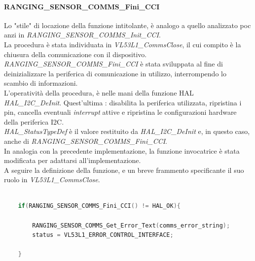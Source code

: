 \documentclass[11pt]{report}
\begin{document}
\paragraph{RANGING\_SENSOR\_COMMS\_Fini\_CCI}
Lo "stile" di locazione della funzione intitolante, è analogo a quello analizzato poc anzi in \textit{RANGING\_SENSOR\_COMMS\_Init\_CCI}.\\
La procedura è stata individuata in \textit{VL53L1\_CommsClose}, il cui compito è la chiusura della comunicazione con il dispositivo.\\
\textit{RANGING\_SENSOR\_COMMS\_Fini\_CCI} è stata sviluppata al fine di deinizializzare la periferica di comunicazione in utilizzo, interrompendo lo scambio di informazioni.\\
L'operatività della procedura, è nelle mani della funzione HAL \textit{HAL\_I2C\_DeInit}. Quest'ultima : disabilita la periferica utilizzata, ripristina i pin, cancella eventuali \textit{interrupt} attive e ripristina le configurazioni hardware della periferica I2C.\\
\textit{HAL\_StatusTypeDef} è il valore restituito da \textit{HAL\_I2C\_DeInit} e, in questo caso, anche di \textit{RANGING\_SENSOR\_COMMS\_Fini\_CCI}.\\
In analogia con la precedente implementazione, la funzione invocatrice è stata modificata per adattarsi all'implementazione.\\
A seguire la definizione della funzione, e un breve frammento specificante il suo ruolo in \textit{VL53L1\_CommsClose}.

\begin{lstlisting}[language=Cpp, caption={Dettaglio sull'invocazione di \textit{RANGING\_SENSOR\_COMMS\_Fini\_CCI} in \textit{VL53L1\_CommsClose}}]
    
    if(RANGING_SENSOR_COMMS_Fini_CCI() != HAL_OK){

        RANGING_SENSOR_COMMS_Get_Error_Text(comms_error_string);
        status = VL53L1_ERROR_CONTROL_INTERFACE;

    }
\end{lstlisting}
\end{document}
